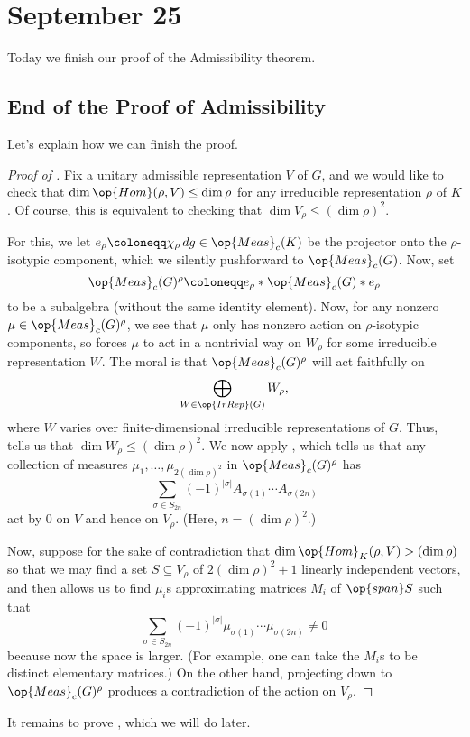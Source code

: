 \documentclass[../notes.tex]{subfiles}
\begin{document}
\section{September 25}
Today we finish our proof of the Admissibility theorem.

\subsection{End of the Proof of Admissibility}
Let's explain how we can finish the proof.
\begin{proof}[Proof of ]
	Fix a unitary admissible representation $V$ of $G$, and we would like to check that $\dim\op{Hom}(\rho,V)\le\dim\rho$ for any irreducible representation $\rho$ of $K$. Of course, this is equivalent to checking that $\dim V_\rho\le(\dim\rho)^2$.

	For this, we let $e_\rho\coloneqq\chi_\rho\,dg\in\op{Meas}_c(K)$ be the projector onto the $\rho$-isotypic component, which we silently pushforward to $\op{Meas}_c(G)$. Now, set
	\[\op{Meas}_c(G)^\rho\coloneqq e_\rho*\op{Meas}_c(G)*e_\rho\]
	to be a subalgebra (without the same identity element). Now, for any nonzero $\mu\in\op{Meas}_c(G)^\rho$, we see that $\mu$ only has nonzero action on $\rho$-isotypic components, so  forces $\mu$ to act in a nontrivial way on $W_\rho$ for some irreducible representation $W$. The moral is that $\op{Meas}_c(G)^\rho$ will act faithfully on
	\[\bigoplus_{W\in\op{IrRep}(G)}W_\rho,\]
	where $W$ varies over finite-dimensional irreducible representations of $G$. Thus,  tells us that $\dim W_\rho\le(\dim\rho)^2$. We now apply , which tells us that any collection of measures $\mu_1,\ldots,\mu_{2(\dim\rho)^2}$ in $\op{Meas}_c(G)^\rho$ has
	\[\sum_{\sigma\in S_{2n}}(-1)^{\left|\sigma\right|}A_{\sigma(1)}\cdots A_{\sigma(2n)}\]
	act by $0$ on $V$ and hence on $V_\rho$. (Here, $n=(\dim\rho)^2$.)

	Now, suppose for the sake of contradiction that $\dim\op{Hom}_K(\rho,V)>(\dim\rho)$ so that we may find a set $S\subseteq V_\rho$ of $2(\dim\rho)^2+1$ linearly independent vectors, and then  allows us to find $\mu_i$s approximating matrices $M_i$ of $\op{span}S$ such that
	\[\sum_{\sigma\in S_{2n}}(-1)^{\left|\sigma\right|}\mu_{\sigma(1)}\cdots \mu_{\sigma(2n)}\ne0\]
	because now the space is larger. (For example, one can take the $M_i$s to be distinct elementary matrices.) On the other hand, projecting down to $\op{Meas}_c(G)^\rho$ produces a contradiction of the action on $V_\rho$.
\end{proof}
It remains to prove , which we will do later.
\end{document}
